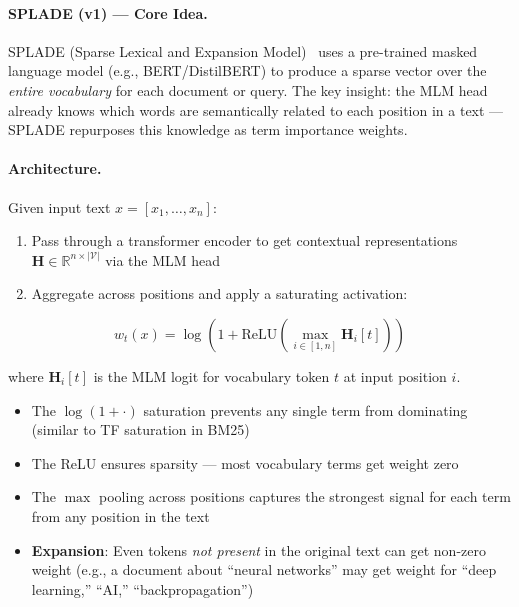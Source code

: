 \paragraph{SPLADE (v1) --- Core Idea.}
\label{splade-v1-core-idea.}

SPLADE (Sparse Lexical and Expansion Model)~\cite{formal2021splade} uses a pre-trained masked language model (e.g., BERT/DistilBERT) to produce a sparse vector over the \emph{entire vocabulary} for each document or query. The key insight: the MLM head already knows which words are semantically related to each position in a text --- SPLADE repurposes this knowledge as term importance weights.

\paragraph{Architecture.}
\label{architecture.}

Given input text $x = [x_1, \ldots, x_n]$:

\begin{enumerate}
  \item Pass through a transformer encoder to get contextual representations $\mathbf{H} \in \mathbb{R}^{n \times |\mathcal{V}|}$ via the MLM head
  \item Aggregate across positions and apply a saturating activation:
\end{enumerate}

\begin{equation}
  w_t(x) = \log\!\left(1 + \text{ReLU}\!\left(\max_{i \in [1,n]} \mathbf{H}_i[t]\right)\right)
\end{equation}

where $\mathbf{H}_i[t]$ is the MLM logit for vocabulary token $t$ at input position $i$.

\begin{itemize}
  \item The $\log(1 + \cdot)$ saturation prevents any single term from dominating (similar to TF saturation in BM25)
  \item The ReLU ensures sparsity --- most vocabulary terms get weight zero
  \item The $\max$ pooling across positions captures the strongest signal for each term from any position in the text
  \item \textbf{Expansion}: Even tokens \emph{not present} in the original text can get non-zero weight (e.g., a document about ``neural networks'' may get weight for ``deep learning,'' ``AI,'' ``backpropagation'')
\end{itemize}

